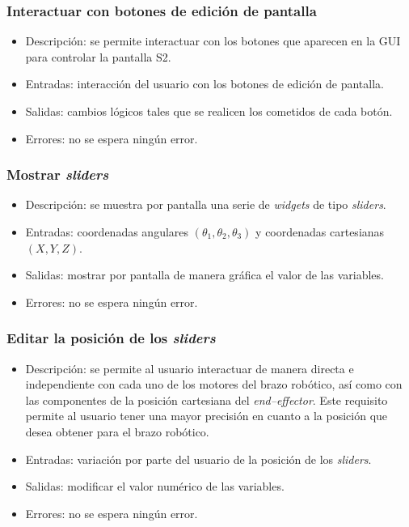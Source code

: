 \subsubsection{Interactuar con botones de edición de pantalla}
\begin{itemize}
    \item Descripción: se permite interactuar con los botones que aparecen en la \ac{GUI} para controlar la pantalla \ac{S2}.
    \item Entradas: interacción del usuario con los botones de edición de pantalla.
    \item Salidas: cambios lógicos tales que se realicen los cometidos de cada botón.
    \item Errores: no se espera ningún error.
\end{itemize}

\subsubsection{Mostrar \textit{sliders}}
\begin{itemize}
    \item Descripción: se muestra por pantalla una serie de \textit{widgets} de tipo \textit{sliders}.  
    \item Entradas: coordenadas angulares $\left(\theta_1, \theta_2, \theta_3\right)$ y coordenadas cartesianas $\left(X,Y,Z\right)$.
    \item Salidas: mostrar por pantalla de manera gráfica el valor de las variables.
    \item Errores: no se espera ningún error.
\end{itemize}

\subsubsection{Editar la posición de los \textit{sliders}}
\begin{itemize}
    \item Descripción: se permite al usuario interactuar de manera directa e independiente con cada uno de los motores del brazo robótico, así como con las componentes de la posición cartesiana del \textit{end--effector}. Este requisito permite al usuario tener una mayor precisión en cuanto a la posición que desea obtener para el brazo robótico.
    \item Entradas: variación por parte del usuario de la posición de los \textit{sliders}.
    \item Salidas: modificar el valor numérico de las variables.
    \item Errores: no se espera ningún error.
\end{itemize}


